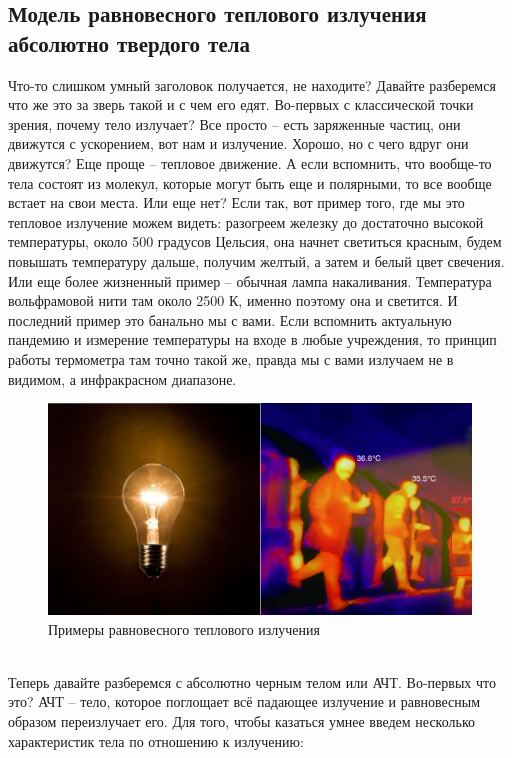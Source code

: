 \documentclass[12pt]{article}
\begin{document}
\subsection{Модель равновесного теплового излучения абсолютно твердого тела}
Что-то слишком умный заголовок получается, не находите? Давайте разберемся что же это за зверь такой и с чем его едят. Во-первых с классической точки зрения, почему тело излучает? Все просто -- есть заряженные частиц, они движутся с ускорением, вот нам и излучение. Хорошо, но с чего вдруг они движутся? Еще проще  -- тепловое движение. А если вспомнить, что вообще-то тела состоят из молекул, которые могут быть еще и полярными, то все вообще встает на свои места. Или еще нет? Если так, вот пример того, где мы это тепловое излучение можем видеть: разогреем железку до достаточно высокой температуры, около 500 градусов Цельсия, она начнет светиться красным, будем повышать температуру дальше, получим желтый, а затем и белый цвет свечения. Или еще более жизненный пример -- обычная лампа накаливания. Температура вольфрамовой нити там около 2500 К, именно поэтому она и светится. И последний пример это банально мы с вами. Если вспомнить актуальную пандемию и измерение температуры на входе в любые учреждения, то принцип работы термометра там точно такой же, правда мы с вами излучаем не в видимом, а инфракрасном диапазоне.
\begin{figure}[h]
    \centering
    \includegraphics[width=\textwidth,height=\textheight,keepaspectratio]{Seminar_01/pics/pic_01.png}
    \caption{Примеры равновесного теплового излучения}
    \label{fig:sem_01_radiation_examples}
\end{figure}
\\
Теперь давайте разберемся с абсолютно черным телом или АЧТ. Во-первых что это? АЧТ -- тело, которое поглощает всё падающее излучение и равновесным образом переизлучает его. Для того, чтобы казаться умнее введем несколько характеристик тела по отношению к излучению: 
\end{document}
